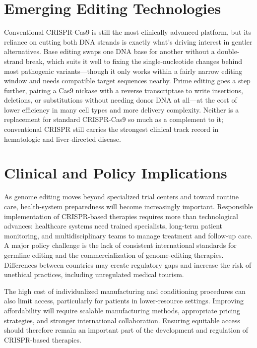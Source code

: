 \documentclass[11pt,a4paper]{article}
\begin{document}
\section{Emerging Editing Technologies}\label{emerging-editing-technologies}

Conventional CRISPR-Cas9 is still the most clinically advanced platform, but its reliance on cutting both DNA strands is exactly what's driving interest in gentler alternatives. Base editing swaps one DNA base for another without a double-strand break, which suits it well to fixing the single-nucleotide changes behind most pathogenic variants---though it only works within a fairly narrow editing window and needs compatible target sequences nearby. Prime editing goes a step further, pairing a Cas9 nickase with a reverse transcriptase to write insertions, deletions, or substitutions without needing donor DNA at all---at the cost of lower efficiency in many cell types and more delivery complexity. Neither is a replacement for standard CRISPR-Cas9 so much as a complement to it; conventional CRISPR still carries the strongest clinical track record in hematologic and liver-directed disease.

\section{Clinical and Policy Implications}\label{clinical-and-policy-implications}

As genome editing moves beyond specialized trial centers and toward routine care, health-system preparedness will become increasingly important. Responsible implementation of CRISPR-based therapies requires more than technological advances: healthcare systems need trained specialists, long-term patient monitoring, and multidisciplinary teams to manage treatment and follow-up care. A major policy challenge is the lack of consistent international standards for germline editing and the commercialization of genome-editing therapies. Differences between countries may create regulatory gaps and increase the risk of unethical practices, including unregulated medical tourism.

The high cost of individualized manufacturing and conditioning procedures can also limit access, particularly for patients in lower-resource settings. Improving affordability will require scalable manufacturing methods, appropriate pricing strategies, and stronger international collaboration. Ensuring equitable access should therefore remain an important part of the development and regulation of CRISPR-based therapies.
\end{document}
